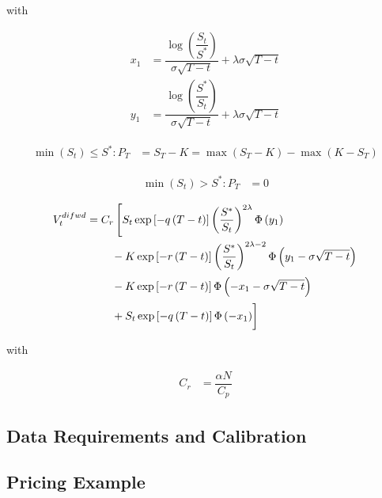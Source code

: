 with

\begin{align*}
x_1 &= \dfrac{\log\left(\dfrac{S_t}{S^*} \right)}{\sigma \sqrt{T-t}} + \lambda \sigma \sqrt{T-t}\\
y_1 &= \dfrac{\log\left(\dfrac{S^*}{S_t} \right)}{\sigma \sqrt{T-t}} + \lambda \sigma \sqrt{T-t}
\end{align*}

\begin{align}
\min\left( S_t\right) \leq S^* : P_T &= S_T -K = \max \left( S_T - K \right) -\max\left( K-S_T \right)
\end{align}

\begin{align}
\min\left( S_t \right) > S^* : P_T &= 0
\end{align}

\begin{align}
    V_t^{difwd} &= C_r \left[ S_t \exp\left[- q \left(T-t\right)\right]\left(\dfrac{S^*}{S_t}\right)^{2 \lambda} \Phi\left(y_1\right) \right.\nonumber\\
   &\qquad \left.\vphantom{\dfrac{S^*}{S_t}} - K \exp\left[- r \left(T-t\right)\right] \left(\dfrac{S^*}{S_t}\right)^{2 \lambda - 2} \Phi\left(y_1 - \sigma \sqrt{T-t}\right) \right.\nonumber\\
   &\qquad \left.\vphantom{\dfrac{S^*}{S_t}} - K \exp\left[- r \left(T-t\right)\right] \Phi\left(-x_1 - \sigma \sqrt{T-t}\right) \right.\nonumber\\
   &\qquad \left.\vphantom{\dfrac{S^*}{S_t}} + S_t \exp\left[- q \left(T-t\right)\right] \Phi\left(- x_1\right) \right] 
\end{align}

with 

\begin{align}
C_r &= \dfrac{\alpha N}{C_p}
\end{align}

\subsection{Data Requirements and Calibration}

\subsection{Pricing Example}
